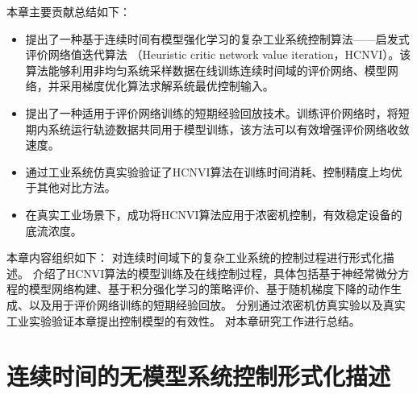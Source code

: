 本章主要贡献总结如下：
\begin{itemize}[nosep]
\item  提出了一种基于连续时间有模型强化学习的复杂工业系统控制算法——启发式评价网络值迭代算法
（Heuristic critic network value iteration，HCNVI）。该算法能够利用非均匀系统采样数据在线训练连续时间域的评价网络、模型网络，并采用梯度优化算法求解系统最优控制输入。
\item  提出了一种适用于评价网络训练的短期经验回放技术。训练评价网络时，将短期内系统运行轨迹数据共同用于模型训练，该方法可以有效增强评价网络收敛速度。
\item  通过工业系统仿真实验验证了HCNVI算法在训练时间消耗、控制精度上均优于其他对比方法。
\item  在真实工业场景下，成功将HCNVI算法应用于浓密机控制，有效稳定设备的底流浓度。
\end{itemize}

本章内容组织如下： 
对连续时间域下的复杂工业系统的控制过程进行形式化描述。
介绍了HCNVI算法的模型训练及在线控制过程，具体包括基于神经常微分方程的模型网络构建、基于积分强化学习的策略评价、基于随机梯度下降的动作生成、以及用于评价网络训练的短期经验回放。
分别通过浓密机仿真实验以及真实工业实验验证本章提出控制模型的有效性。
对本章研究工作进行总结。

\section{连续时间的无模型系统控制形式化描述}
\label{sec:formulation}

